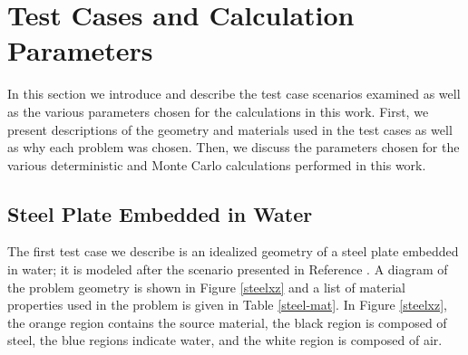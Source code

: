 \documentclass{article} %
\begin{document}


\section{Test Cases and Calculation Parameters}

In this section we introduce and describe the test case scenarios examined as
well as the various parameters chosen for the calculations in this work. First,
we present descriptions of the geometry and materials used in the test cases as well as why each problem was chosen.
Then, we discuss the parameters chosen for the various deterministic and Monte
Carlo calculations performed in this work.

\subsection{Steel Plate Embedded in Water}
\label{sec:steel_params}

The first test case we describe is an idealized geometry of a steel plate 
embedded in water; it is modeled after the scenario presented in Reference 
\cite{wilsonslaybaugh}. 
A diagram of the problem geometry is shown in Figure \ref{steelxz} and a list
of material properties used in the problem is given in Table \ref{steel-mat}.
In Figure \ref{steelxz}, the orange region contains the source material, the 
black region is composed of steel, the blue regions indicate water, and the 
white region is composed of air.
\end{document}
